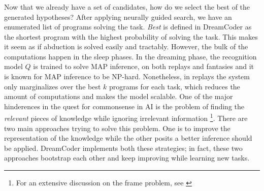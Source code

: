 \subsubsection{}
Now that we already have a set of candidates, how do we select the best of the generated hypotheses? After applying neurally guided search, we have an enumerated list of programs solving the task. \textit{Best} is defined in DreamCoder as the shortest program with the highest probability of solving the task. This makes it seem as if abduction is solved easily and tractably. However, the bulk of the computations happen in the sleep phases. In the dreaming phase, the recognition model $Q$ is trained to solve MAP inference, on both replays and fantasies and it is known for MAP inference to be NP-hard. Nonetheless, in replays the system only marginalizes over the best $k$ programs for each task, which reduces the amount of computations and makes the model scalable. 
One of the major hinderences in the quest for commonsense in AI is the problem of finding the \emph{relevant} pieces of knowledge while ignoring irrelevant information \footnote{For an extensive discussion on the frame problem, see \cite{haselager1997}}.
There are two main approaches trying to solve this problem. One is to improve the representation of the knowledge while the other posits a better inference should be applied. DreamCoder implements both these strategies; in fact, these two approaches bootstrap each other and keep improving while learning new tasks.

